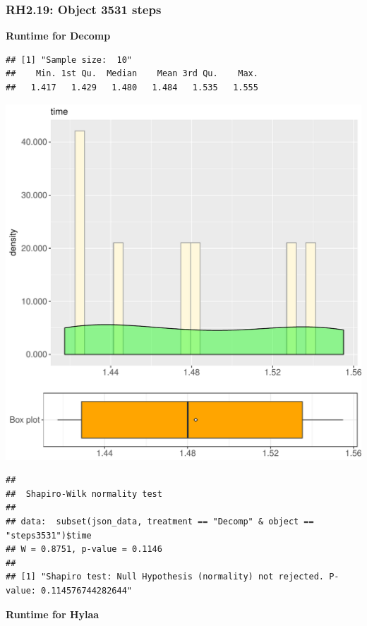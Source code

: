\documentclass{article}\usepackage[]{graphicx}\usepackage[]{color}
\makeatletter
\def\maxwidth{ %
  \ifdim\Gin@nat@width>\linewidth
    \linewidth
  \else
    \Gin@nat@width
  \fi
}
\newenvironment{kframe}{%
 \def\at@end@of@kframe{}%
 \ifinner\ifhmode%
  \def\at@end@of@kframe{\end{minipage}}%
  \begin{minipage}{\columnwidth}%
 \fi\fi%
 \def\FrameCommand##1{\hskip\@totalleftmargin \hskip-\fboxsep
 \colorbox{shadecolor}{##1}\hskip-\fboxsep
     \hskip-\linewidth \hskip-\@totalleftmargin \hskip\columnwidth}%
 \MakeFramed {\advance\hsize-\width
   \@totalleftmargin\z@ \linewidth\hsize
   \@setminipage}}%
 {\par\unskip\endMakeFramed%
 \at@end@of@kframe}
\newenvironment{knitrout}{}{} %
\makeatother
\begin{document}
\subsubsection{RH2.19: Object 3531 steps}

 \textbf{Runtime for Decomp}
\begin{knitrout}
\color{fgcolor}\begin{kframe}
\begin{verbatim}
## [1] "Sample size:  10"
##    Min. 1st Qu.  Median    Mean 3rd Qu.    Max. 
##   1.417   1.429   1.480   1.484   1.535   1.555
\end{verbatim}
\end{kframe}
\includegraphics[width=\maxwidth]{figure/RH2_Decomp_steps3531-1} 
\begin{kframe}\begin{verbatim}
## 
## 	Shapiro-Wilk normality test
## 
## data:  subset(json_data, treatment == "Decomp" & object == "steps3531")$time
## W = 0.8751, p-value = 0.1146
## 
## [1] "Shapiro test: Null Hypothesis (normality) not rejected. P-value: 0.114576744282644"
\end{verbatim}
\end{kframe}
\end{knitrout}
 \textbf{Runtime for Hylaa}
\end{document}
